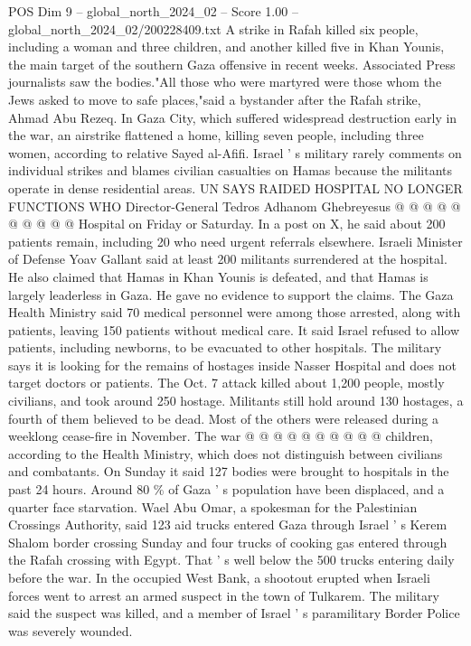 \begin{textsample}{POS Dim 9 – global\_north\_2024\_02 – Score 1.00 – global\_north\_2024\_02/200228409.txt}
A strike in Rafah killed six people, including a woman and three children, and another killed five in Khan Younis, the main target of the southern Gaza offensive in recent weeks.
Associated Press journalists saw the bodies."All those who were martyred were those whom the Jews asked to move to safe places,"said a bystander after the Rafah strike, Ahmad Abu Rezeq.
In Gaza City, which suffered widespread destruction early in the war, an airstrike flattened a home, killing seven people, including three women, according to relative Sayed al-Afifi.
Israel ' s military rarely comments on individual strikes and blames civilian casualties on Hamas because the militants operate in dense residential areas.
UN SAYS RAIDED HOSPITAL NO LONGER FUNCTIONS WHO Director-General Tedros Adhanom Ghebreyesus @ @ @ @ @ @ @ @ @ @ Hospital on Friday or Saturday.
In a post on X, he said about 200 patients remain, including 20 who need urgent referrals elsewhere.
Israeli Minister of Defense Yoav Gallant said at least 200 militants surrendered at the hospital.
He also claimed that Hamas in Khan Younis is defeated, and that Hamas is largely leaderless in Gaza.
He gave no evidence to support the claims.
The Gaza Health Ministry said 70 medical personnel were among those arrested, along with patients, leaving 150 patients without medical care.
It said Israel refused to allow patients, including newborns, to be evacuated to other hospitals.
The military says it is looking for the remains of hostages inside Nasser Hospital and does not target doctors or patients.
The Oct. 7 attack killed about 1,200 people, mostly civilians, and took around 250 hostage.
Militants still hold around 130 hostages, a fourth of them believed to be dead.
Most of the others were released during a weeklong cease-fire in November.
The war @ @ @ @ @ @ @ @ @ @ children, according to the Health Ministry, which does not distinguish between civilians and combatants.
On Sunday it said 127 bodies were brought to hospitals in the past 24 hours.
Around 80 \% of Gaza ' s population have been displaced, and a quarter face starvation.
Wael Abu Omar, a spokesman for the Palestinian Crossings Authority, said 123 aid trucks entered Gaza through Israel ' s Kerem Shalom border crossing Sunday and four trucks of cooking gas entered through the Rafah crossing with Egypt.
That ' s well below the 500 trucks entering daily before the war.
In the occupied West Bank, a shootout erupted when Israeli forces went to arrest an armed suspect in the town of Tulkarem.
The military said the suspect was killed, and a member of Israel ' s paramilitary Border Police was severely wounded.

\end{textsample}
